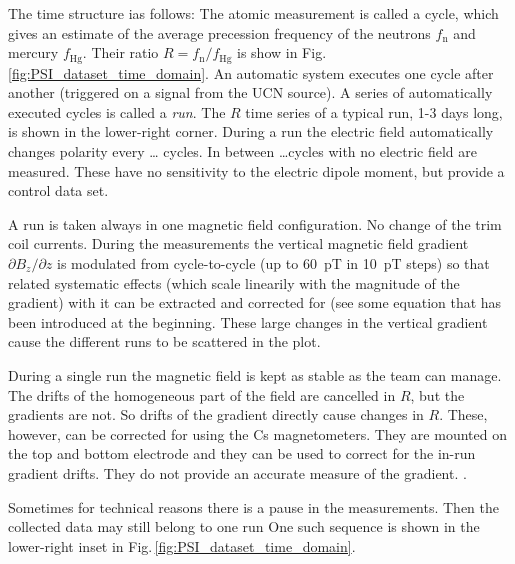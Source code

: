 The time structure ias follows: The atomic measurement is called a cycle, which gives an estimate of the average precession frequency of the neutrons $f_\mathrm{n}$ and mercury $f_\mathrm{Hg}$. Their ratio $R = f_\mathrm{n} / f_\mathrm{Hg}$ is show in Fig.\,\ref{fig:PSI_dataset_time_domain}. An automatic system executes one cycle after another (triggered on a signal from the UCN source). A series of automatically executed cycles is called a \emph{run}. The $R$ time series of a typical run, 1-3 days long, is shown in the lower-right corner. During a run the electric field automatically changes polarity every \ldots {} cycles. In between \ldots cycles with no electric field are measured. These have no sensitivity to the electric dipole moment, but provide a control data set.

A run is taken always in one magnetic field configuration. No change of the trim coil currents. During the measurements the vertical magnetic field gradient $\partial B_z / \partial z$ is modulated from cycle-to-cycle (up to \SI{60}{\pico\tesla} in \SI{10}{\pico\tesla} steps) so that related systematic effects (which scale linearily with the magnitude of the gradient) with it can be extracted and corrected for (see some equation that has been introduced at the beginning. These large changes in the vertical gradient cause the different runs to be scattered in the plot.

During a single run the magnetic field is kept as stable as the team can manage. The drifts of the homogeneous part of the field are cancelled in $R$, but the gradients are not. So drifts of the gradient directly cause changes in $R$. These, however, can be corrected for using the Cs magnetometers. They are mounted on the top and bottom electrode and they can be used to correct for the in-run gradient drifts. They do not provide an accurate measure of the gradient. .

Sometimes for technical reasons there is a pause in the measurements. Then the collected data may still belong to one run One such sequence is shown in the lower-right inset in Fig.\,\ref{fig:PSI_dataset_time_domain}.

